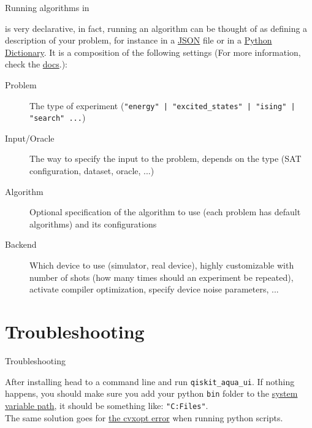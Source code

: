 \documentclass[aspectratio=43]{beamer}
\begin{document}
\begin{frame}{Running algorithms in \qka}
\small{
    \qka is very declarative, in fact, running an algorithm can be thought of as defining a description of your problem, for instance in a \href{https://www.json.org/}{JSON} file or in a \href{https://docs.python.org/3/tutorial/datastructures.html#dictionaries}{Python Dictionary}. It is a composition of the following settings (For more information, check the \href{https://qiskit.org/documentation/aqua/execution.html#input-file}{docs}.):
    \begin{description}
        \item[Problem] The type of experiment (\texttt{"energy" | "excited_states" | "ising" | "search" ...})
        \item[Input/Oracle] The way to specify the input to the problem, depends on the type (SAT configuration, dataset, oracle, ...)
        \item[Algorithm] Optional specification of the algorithm to use (each problem has default algorithms) and its configurations
        \item[Backend] Which device to use (simulator, real device), highly customizable with number of shots (how many times should an experiment be repeated), activate compiler optimization, specify device noise parameters, ...
    \end{description}
}
\pagenumber
\end{frame}

\section{Troubleshooting \qka}
\begin{frame}{Troubleshooting \qka}
    \begin{card}
        After installing head to a command line and run  \texttt{qiskit_aqua_ui}. If nothing happens, you should make sure you add your python \texttt{bin} folder to the \href{https://docs.alfresco.com/4.2/tasks/fot-addpath.html}{system variable path}, it should be something like: \texttt{"C:\Program Files\Library\bin"}.\\
        The same solution goes for \href{https://stackoverflow.com/questions/14778178/import-cvxopt-base-the-specified-module-could-not-be-found}{the cvxopt error} when running python scripts.
    \end{card}
\pagenumber
\end{frame}
\end{document}
